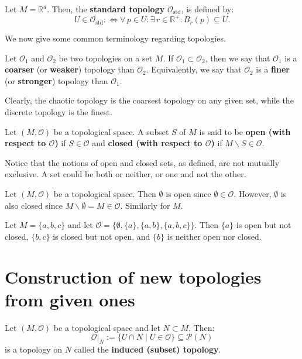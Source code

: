 \documentclass[root.tex]{subfiles}
\begin{document}
\begin{mydef}
  Let $M = \mathbb{R}^d$. Then, the \textbf{standard topology}   $\mathcal{O}_\mathrm{std}$, is defined by:
$$
U \in \mathcal{O}_\mathrm{std} :\Leftrightarrow \forall \, p \in U : \exists \, r \in \mathbb{R} ^+ : B_r(p) \subseteq U.
$$
\end{mydef}


We now give some common terminology regarding topologies.

\begin{mydef}
  Let $\mathcal{O}_1$ and $\mathcal{O}_2$ be two topologies on a set $M$. If $\mathcal{O}_1 \subset \mathcal{O}_2$, then we say that $\mathcal{O}_1$ is a \textbf{coarser} (or \textbf{weaker}) topology than $\mathcal{O}_2$. Equivalently, we say that $\mathcal{O}_2$ is a \textbf{finer} (or \textbf{stronger}) topology than $\mathcal{O}_1$.
\end{mydef}
Clearly, the chaotic topology is the coarsest topology on any given set, while the discrete topology is the finest.
\begin{mydef}
  Let $(M,\mathcal{O})$ be a topological space. A subset $S$ of $M$ is said to be \textbf{open (with respect to $\mathcal{O}$)} if $S \in \mathcal{O}$ and \textbf{closed (with respect to $\mathcal{O}$)} if $M\backslash S \in \mathcal{O}$. 
\end{mydef}
Notice that the notions of open and closed sets, as defined, are not mutually exclusive. A set could be both or neither, or one and not the other.
\begin{myex}
Let $(M,\mathcal{O})$ be a topological space. Then $\emptyset$ is open since $\emptyset \in \mathcal{O}$. However, $\emptyset$ is also closed since $M\backslash \emptyset = M \in \mathcal{O}$. Similarly for $M$.
\end{myex}
\begin{myex}
Let $M = \{a,b,c\}$ and let $\mathcal{O}=\{\emptyset,\{a\},\{a,b\},\{a,b,c\}\}$. Then $\{a\}$ is open but not closed, $\{b,c\}$ is closed but not open, and $\{b\}$ is neither open nor closed.
\end{myex}


\section{Construction of new topologies from given ones}

\begin{mydef}
Let $(M,\mathcal{O})$ be a topological space and let $N\subset M$. Then:
$$
\mathcal{O}|_N := \{U\cap N \mid U \in \mathcal{O}\} \subseteq \mathcal{P}(N)
$$
is a topology on $N$ called the \textbf{induced (subset) topology}.
\end{mydef}
\end{document}
